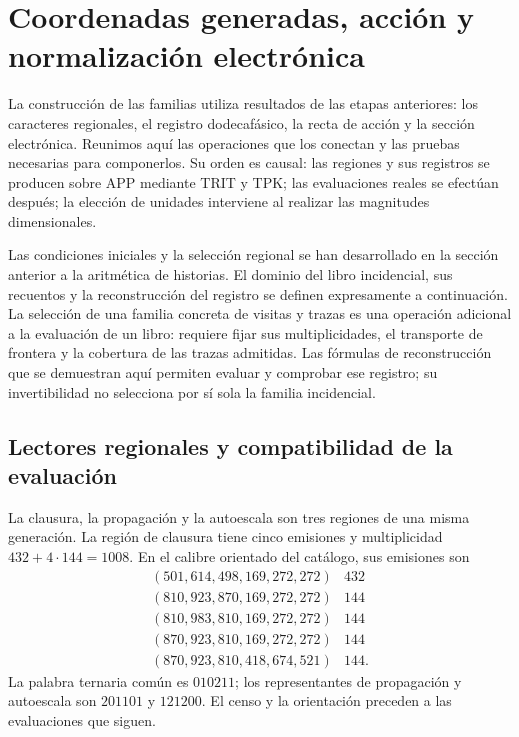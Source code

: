\section{Coordenadas generadas, acción y normalización electrónica}
\label{vi:vi:dep:seccion}\label{vi:sec:k-registro}

La construcción de las familias utiliza resultados de las etapas anteriores:
los caracteres regionales, el registro dodecafásico, la recta de acción y la
sección electrónica. Reunimos aquí las operaciones que los conectan y las
pruebas necesarias para componerlos. Su orden es causal: las regiones y sus
registros se producen sobre APP mediante TRIT y TPK; las evaluaciones reales
se efectúan después; la elección de unidades interviene al realizar las
magnitudes dimensionales.

Las condiciones iniciales y la selección regional se han desarrollado en
la sección anterior a la aritmética de historias. El dominio del libro
incidencial, sus recuentos y la reconstrucción del registro se definen
expresamente a continuación. La selección de una familia concreta de
visitas y trazas es una operación adicional a la evaluación de un libro:
requiere fijar sus multiplicidades, el transporte de frontera y la
cobertura de las trazas admitidas. Las fórmulas de reconstrucción que se
demuestran aquí permiten evaluar y comprobar ese registro; su
invertibilidad no selecciona por sí sola la familia incidencial.

\subsection{Lectores regionales y compatibilidad de la evaluación}
\label{vi:vi:dep:regiones}

La clausura, la propagación y la autoescala son tres regiones de una misma
generación. La región de clausura tiene cinco emisiones y multiplicidad
\(432+4\cdot144=1008\). En el calibre orientado del catálogo, sus emisiones
son
\[
\begin{array}{c|r}
(501,614,498,169,272,272)&432\\
(810,923,870,169,272,272)&144\\
(810,983,810,169,272,272)&144\\
(870,923,810,169,272,272)&144\\
(870,923,810,418,674,521)&144.
\end{array}
\]
La palabra ternaria común es \(010211\); los representantes de propagación
y autoescala son \(201101\) y \(121200\). El censo y la orientación
preceden a las evaluaciones que siguen.

